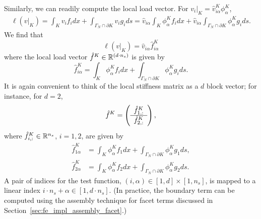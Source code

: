 Similarly, we can readily compute the local load vector. For $v_i|_K = \hat v^K_{i\alpha} \phi^K_\alpha$, 
\begin{align*}
  \ell(v|_K) = \int_K v_i f_i dx + \int_{\Gamma_N \cap \partial K} v_i g_i ds 
  =  \hat v_{i\alpha} \int_K \phi^K_\alpha f_{i} dx + \hat v_{i\alpha} \int_{\Gamma_N \cap \partial K} \phi^K_\alpha g_i ds.
\end{align*}
We find that
\begin{equation*}
  \ell(v|_K) = \hat v_{i\alpha} \hat f^K_{i\alpha}
\end{equation*}
where the local load vector $\hat f^K \in \RR^{(d\cdot n_s)}$ is given by
\begin{equation*}
  \hat f^K_{i\alpha} =  \int_K \phi^K_\alpha f_{i} dx + \int_{\Gamma_N \cap \partial K} \phi^K_\alpha g_i ds.
\end{equation*}
It is again convenient to think of the local stiffness matrix as a $d$ block vector; for instance, for $d = 2$,
\begin{equation*}
  \hat f^K = \bmat{c} \hat f^K_{1,:} \\ \hline \hat f^K_{2,:} \emat,
\end{equation*}
where $\hat f^K_{i,:} \in \RR^{n_s}$, $i = 1,2$, are given by
\begin{align*}
  \hat f^K_{1\alpha} &= \int_K \phi^K_\alpha f_{1} dx + \int_{\Gamma_N \cap \partial K} \phi^K_\alpha g_1 ds, \\
  \hat f^K_{2\alpha} &= \int_K \phi^K_\alpha f_{2} dx + \int_{\Gamma_N \cap \partial K} \phi^K_\alpha g_2 ds .
\end{align*}
 A pair of indices for the test function, $(i,\alpha) \in [1,d] \times [1,n_s]$, is mapped to a linear index $i \cdot n_s + \alpha \in [1,d\cdot n_s]$. (In practice, the boundary term can be computed using the assembly technique for facet terms discussed in Section~\ref{sec:fe_impl_assembly_facet}.)

